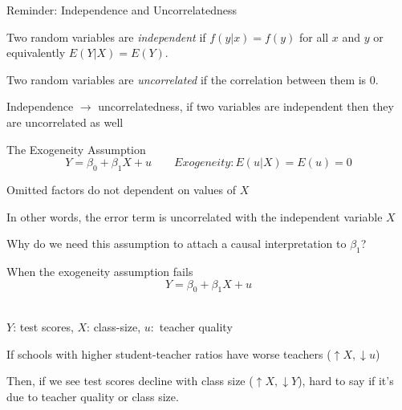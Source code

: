 \documentclass{./../div_teaching_slides}
\begin{document}

\begin{frame}{\large Reminder: Independence and Uncorrelatedness}
\begin{witemize}
\item Two random variables are \textit{independent} if $ f(y|x) = f(y)$ for all $x$ and $y$ or equivalently $ E(Y|X) = E(Y)$. 
\item Two random variables are \textit{uncorrelated} if the correlation between them is 0. 
\item Independence $\rightarrow$ uncorrelatedness, if two variables are independent then they are uncorrelated as well
\end{witemize}
\end{frame}

\begin{frame}{The Exogeneity Assumption}
$$ Y = \beta_0 + \beta_1 X + u \quad \quad Exogeneity: E(u|X) = E(u) = 0$$ 
\begin{witemize}
  \item Omitted factors do not dependent on values of $X$
  \item In other words, the error term is uncorrelated with the independent variable $X$ 
  \item Why do we need this assumption to attach a causal interpretation to $\beta_1$?
\end{witemize}
\end{frame}

\begin{frame}{When the exogeneity assumption fails}
$$ Y = \beta_0 + \beta_1 X + u $$ \\ \vspace{0.5em}
\begin{witemize}
\item $Y$: test scores, $X$: class-size, $u:$ teacher quality
 \item If schools with higher student-teacher ratios have worse teachers ($ \uparrow X, \downarrow u$)
 \item Then, if we see test scores decline with class size ($ \uparrow X, \downarrow Y$), hard to say if it's due to teacher quality or class size.
\end{witemize}
\end{frame}
\end{document}
